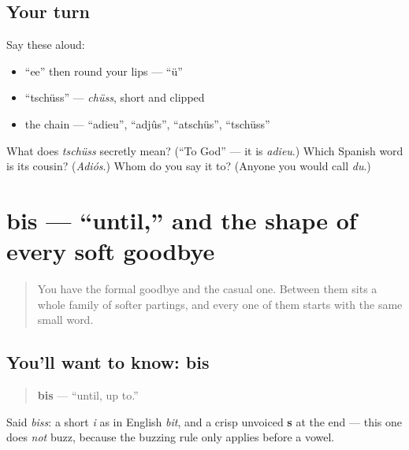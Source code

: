 \subsection*{Your turn}
Say these aloud:

\begin{itemize}
\raggedright
  \item \textquotedblleft{}ee\textquotedblright{} then round your lips — \textquotedblleft{}ü\textquotedblright{}
  \item \textquotedblleft{}tschüss\textquotedblright{} — \emph{chüss}, short and clipped
  \item the chain — \textquotedblleft{}adieu\textquotedblright{}, \textquotedblleft{}adjûs\textquotedblright{}, \textquotedblleft{}atschüs\textquotedblright{}, \textquotedblleft{}tschüss\textquotedblright{}
\end{itemize}

\begin{tcolorbox}[breakable,colback=teal!4,colframe=teal!35!black,title={Before you move on}]
What does \emph{tschüss} secretly mean? (\textquotedblleft{}To God\textquotedblright{} — it is \emph{adieu}.) Which Spanish word is its cousin? (\emph{Adiós}.) Whom do you say it to? (Anyone you would call \emph{du}.)
\end{tcolorbox}
\section[bis]{bis — \textquotedblleft{}until,\textquotedblright{} and the shape of every soft goodbye}

\label{lesson:GE-C04-bis}



\begin{quote}
You have the formal goodbye and the casual one. Between them sits a whole family of softer partings, and every one of them starts with the same small word.
\end{quote}

\subsection*{You'll want to know: bis}
\begin{quote}
\textbf{bis} — \textquotedblleft{}until, up to.\textquotedblright{}
\end{quote}

Said \emph{biss}: a short \emph{i} as in English \emph{bit}, and a crisp unvoiced \textbf{s} at the end — this one does \emph{not} buzz, because the buzzing rule only applies before a vowel.

